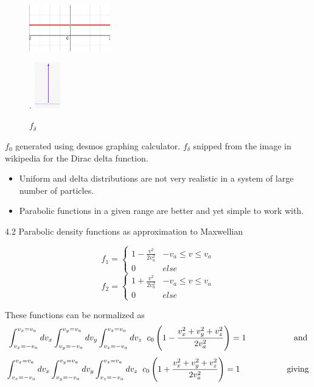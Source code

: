 \documentclass{beamer}
\begin{document}
	\begin{frame}
		\begin{figure}[H]
			\begin{multicols}{2}
				\includegraphics[width=\linewidth, height=2cm]{uniform.png} \caption{$f_{0}$} .
				\includegraphics[width=\linewidth, height=2cm]{dirac.png} \caption{$f_{\delta}$}
			\end{multicols}
		\end{figure} 
	
		$f_{0}$ generated using desmos graphing calculator. $f_{\delta}$ snipped from the image in wikipedia for the Dirac delta function.
		
		\begin{itemize}
			\item Uniform and delta distributions are not very realistic in a system of large number of particles. 
			\item Parabolic functions in a given range are better and yet simple to work with.
		\end{itemize}
		
		
	\end{frame}

	\begin{frame}[t]{4.2 Parabolic density functions as approximation to Maxwellian}
	
	\[f_{1} =
	\begin{cases} 
		1- \frac{v^{2}}{2 v_{a}^2} & -v_{a}\leq v\leq v_{a} \\
		0 & else 
	\end{cases}
	\]
	\[ f_{2} = 
	\begin{cases}
		1 + \frac{v^{2}}{2 v_{a}^2} & -v_{a}\leq v\leq v_{a} \\
		0 & else
	\end{cases}\]

	These functions can be normalized as
	$$ \int_{v_{x} = -v_{a}}^{v_{x} = v_{a}} dv_{x} \int_{v_{y} = -v_{a}}^{v_{y} = v_{a}} dv_{y} \int_{v_{z} = -v_{a}}^{v_{z} = v_{a}} dv_{z} \hspace{0.2cm}c_{0}  \left(1 - \frac{v_{x}^{2}+v_{y}^{2}+v_{z}^{2}}{2 v_{a}^2}\right) = 1 \hspace{2cm} \mathrm{and}$$
	$$ \int_{v_{x} = -v_{a}}^{v_{x} = v_{a}} dv_{x} \int_{v_{y} = -v_{a}}^{v_{y} = v_{a}} dv_{y} \int_{v_{z} = -v_{a}}^{v_{z} = v_{a}} dv_{z} \hspace{0.2cm} c_{0}  \left(1 + \frac{v_{x}^{2}+v_{y}^{2}+v_{z}^{2}}{2 v_{a}^2}\right) = 1 \hspace{2cm} \mathrm{giving}$$

	\end{frame}
\end{document}
